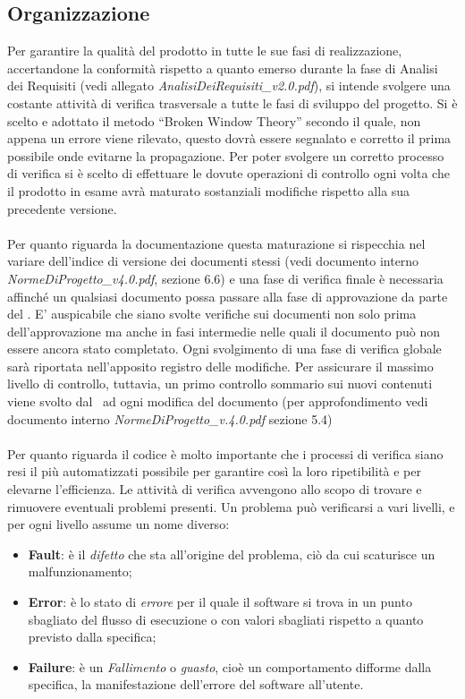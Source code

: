 \subsection{Organizzazione}

Per garantire la qualità del prodotto in tutte le sue fasi di realizzazione, accertandone la conformità rispetto a quanto emerso durante la fase di Analisi dei Requisiti (vedi allegato \textit{AnalisiDeiRequisiti\_v2.0.pdf}), si intende svolgere una costante attività di verifica trasversale a tutte le fasi di sviluppo del progetto. Si è scelto e adottato il metodo ``Broken Window Theory'' secondo il quale, non appena un errore viene rilevato, questo dovrà essere segnalato e corretto il prima possibile onde evitarne la propagazione. Per poter svolgere un corretto processo di verifica si è scelto di effettuare le dovute operazioni di controllo ogni volta che il prodotto in esame avrà maturato sostanziali modifiche rispetto alla sua precedente versione. \\ \\
Per quanto riguarda la documentazione questa maturazione si rispecchia nel variare dell'indice di versione dei documenti stessi (vedi documento interno \textit{NormeDiProgetto\_v4.0.pdf}, sezione 6.6) e una fase di verifica finale è necessaria affinché un qualsiasi documento possa passare alla fase di approvazione da parte del \ruoloResponsabile. E' auspicabile che siano svolte verifiche sui documenti non solo prima dell'approvazione ma anche in fasi intermedie nelle quali il documento può non essere ancora stato completato. Ogni svolgimento di una fase di verifica globale sarà riportata nell'apposito registro delle modifiche. Per assicurare il massimo livello di controllo, tuttavia, un primo controllo sommario sui nuovi contenuti viene svolto dal \ruoloVerificatore\ ad ogni modifica del documento (per approfondimento vedi documento interno \textit{NormeDiProgetto\_v.4.0.pdf} sezione 5.4)
\\ \\
 Per quanto riguarda il codice è molto importante che i processi di verifica siano resi il più automatizzati possibile per garantire così la loro ripetibilità e per elevarne l'efficienza. Le attività di verifica avvengono allo scopo di trovare e rimuovere eventuali problemi presenti. Un problema può verificarsi a vari livelli, e per ogni livello assume un nome diverso:
\begin{itemize}
	\item \textbf{Fault}: è il \textit{difetto} che sta all'origine del problema, ciò da cui scaturisce un malfunzionamento;
	\item \textbf{Error}: è lo stato di \textit{errore} per il quale il software si trova in un punto sbagliato del flusso di esecuzione o con valori sbagliati rispetto a quanto previsto dalla specifica;
	\item \textbf{Failure}: è un \textit{Fallimento} o \textit{guasto}, cioè un comportamento difforme dalla specifica, la manifestazione dell'errore del software all'utente.
\end{itemize}\\
